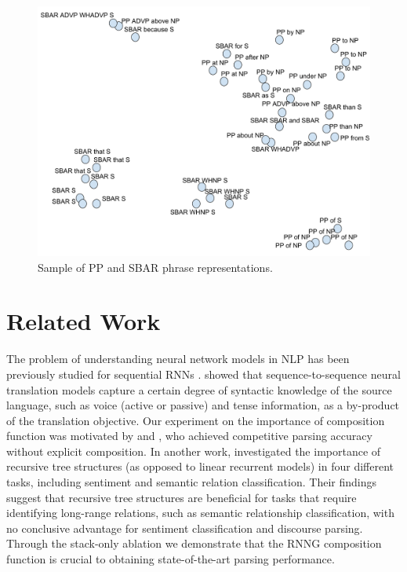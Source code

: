 \documentclass[11pt]{article}
\begin{document}
\begin{figure}[h]
\includegraphics[scale=0.25]{EACL_PP_SBAR.pdf}
\caption{Sample of PP and SBAR phrase representations.
\label{fig:pp-sbar}}
\end{figure}



\section{Related Work}\label{sec:related_works}
The problem of understanding neural network models in NLP has been previously studied for sequential RNNs \cite{karpathy_15,li_16}. %
 showed that sequence-to-sequence neural translation models capture a certain degree of syntactic knowledge of the source language, such as voice (active or passive) and tense information, as a by-product of the translation objective. Our experiment on the importance of composition function was motivated by  and , who achieved competitive parsing accuracy without explicit composition. In another work,  investigated the importance of recursive tree structures (as opposed to linear recurrent models) in four different tasks, including sentiment and semantic relation classification. Their findings suggest that recursive tree structures are beneficial for tasks that require identifying long-range relations, such as semantic relationship classification, with no conclusive advantage for sentiment classification and discourse parsing. Through the stack-only ablation we demonstrate that the RNNG composition function is crucial to obtaining state-of-the-art parsing performance.%
\end{document}
